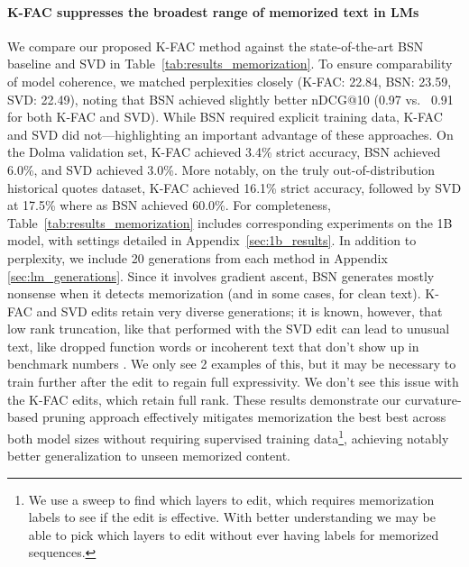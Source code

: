 \documentclass{article} %
\begin{document}
\paragraph{K-FAC suppresses the broadest range of memorized text in LMs}
We compare our proposed K-FAC method against the state-of-the-art BSN baseline and SVD in Table~\ref{tab:results_memorization}. To ensure comparability of model coherence, we matched perplexities closely (K-FAC: 22.84, BSN: 23.59, SVD: 22.49), noting that BSN achieved slightly better nDCG@10 (0.97 vs. ~0.91 for both K-FAC and SVD). While BSN required explicit training data, K-FAC and SVD did not—highlighting an important advantage of these approaches. On the Dolma validation set, K-FAC achieved 3.4\% strict accuracy, BSN achieved 6.0\%, and SVD achieved 3.0\%. More notably, on the truly out-of-distribution historical quotes dataset, K-FAC achieved 16.1\% strict accuracy, followed by SVD at 17.5\% where as BSN achieved 60.0\%. For completeness, Table~\ref{tab:results_memorization} includes corresponding experiments on the 1B model, with settings detailed in Appendix~\ref{sec:1b_results}. In addition to perplexity, we include 20 generations from each method in Appendix \ref{sec:lm_generations}. Since it involves gradient ascent, BSN generates mostly nonsense when it detects memorization (and in some cases, for clean text). K-FAC and SVD edits retain very diverse generations; it is known, however, that low rank truncation, like that performed with the SVD edit can lead to unusual text, like dropped function words or incoherent text that don't show up in benchmark numbers \citep{sharmatruth, jaiswal2024compressing}. We only see 2 examples of this, but it may be necessary to train further after the edit to regain full expressivity. We don't see this issue with the K-FAC edits, which retain full rank. These results demonstrate our curvature-based pruning approach effectively mitigates memorization the best best across both model sizes without requiring supervised training data\footnote{We use a sweep to find which layers to edit, which requires memorization labels to see if the edit is effective. With better understanding we may be able to pick which layers to edit without ever having labels for memorized sequences.}, achieving notably better generalization to unseen memorized content.%
\end{document}
